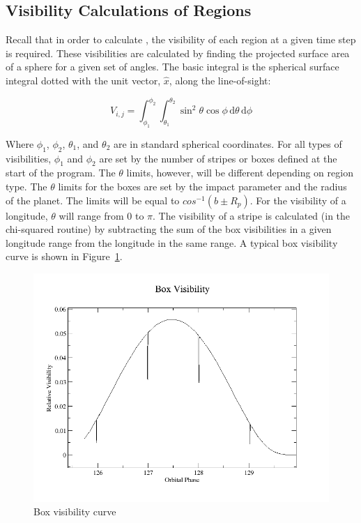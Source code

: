 

\subsection{Visibility Calculations of Regions \label{vis}}
Recall that in order to calculate \fmod, the visibility of each region at a given time step is required. These visibilities are calculated by finding the projected surface area of a sphere for a given set of angles. The basic integral is the spherical surface integral dotted with the unit vector, $\hat{x}$, along the line-of-sight:

\begin{equation}
	V_{i,j} = \int_{\phi_1}^{\phi_2} \int_{\theta_1}^{\theta_2} \sin^2{\theta}\cos{\phi}\,\mathrm{d}\theta \, \mathrm{d}\phi
\end{equation}

Where $\phi_1$, $\phi_2$, $\theta_1$, and $\theta_2$ are in standard spherical coordinates. For all types of visibilities, $\phi_1$ and $\phi_2$ are set by the number of stripes or boxes defined at the start of the program. The $\theta$ limits, however, will be different depending on region type.
The $\theta$ limits for the boxes are set by the impact parameter and the radius of the planet. The limits will be equal to $cos^{-1}(b \pm R_p)$. For the visibility of a longitude, $\theta$ will range from 0 to $\pi$. The visibility of a stripe is calculated (in the chi-squared routine) by subtracting the sum of the box visibilities in a given longitude range from the longitude in the same range. A typical box visibility curve is shown in Figure~\ref{box_vis}. %


\begin{figure}[h]
	\centering
	\includegraphics[width=.5\textwidth]{images/box_vis.png}
	\caption{Box visibility curve}
	\label{box_vis}
\end{figure}